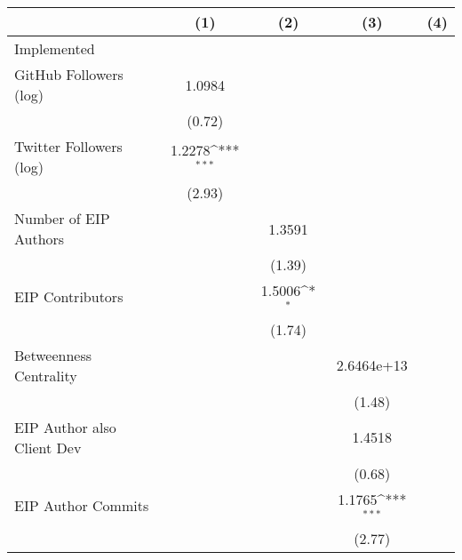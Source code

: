 {
\def\sym#1{\ifmmode^{#1}\else\(^{#1}\)\fi}
\begin{tabular}{l*{4}{c}}
\hline\hline
                                   &\multicolumn{1}{c}{(1)}         &\multicolumn{1}{c}{(2)}         &\multicolumn{1}{c}{(3)}         &\multicolumn{1}{c}{(4)}         \\
\hline
Implemented                        &                   &                   &                   &                   \\
GitHub Followers (log)             &    1.0984         &                   &                   &                   \\
                                   &    (0.72)         &                   &                   &                   \\
[1em]
Twitter Followers (log)            &    1.2278\sym{***}&                   &                   &                   \\
                                   &    (2.93)         &                   &                   &                   \\
[1em]
Number of EIP Authors              &                   &    1.3591         &                   &                   \\
                                   &                   &    (1.39)         &                   &                   \\
[1em]
EIP Contributors                   &                   &    1.5006\sym{*}  &                   &                   \\
                                   &                   &    (1.74)         &                   &                   \\
[1em]
Betweenness Centrality             &                   &                   &2.6464e+13         &                   \\
                                   &                   &                   &    (1.48)         &                   \\
[1em]
EIP Author also Client Dev         &                   &                   &    1.4518         &                   \\
                                   &                   &                   &    (0.68)         &                   \\
[1em]
EIP Author Commits                 &                   &                   &    1.1765\sym{***}&                   \\
                                   &                   &                   &    (2.77)         &                   \\

\end{tabular}}
